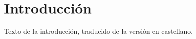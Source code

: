 \chapter*{Introducción} %
\label{introduccion}

Texto de la introducción, traducido de la versión en castellano.